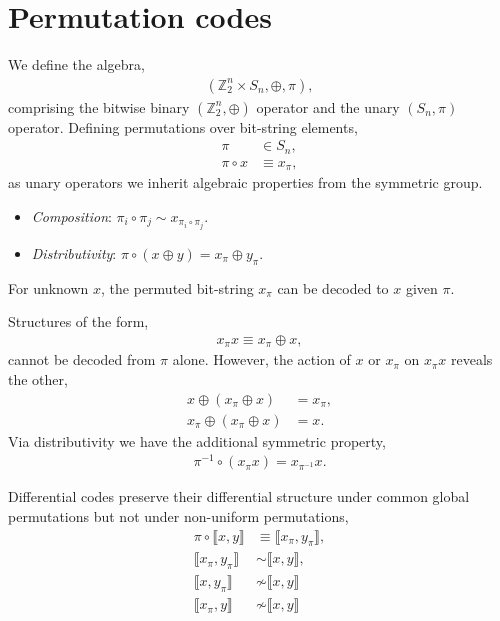 \documentclass[twocolumn, aps, amsmath, amssymb, nofootinbib, superscriptaddress, longbibliography, doublefloatfix, table-of-contents, eqsecnum, rmp]{revtex4-2}
\def\diff#1#2{\llbracket #1,#2\rrbracket}
\begin{document}

\section{Permutation codes}

We define the algebra,
\begin{align}
	(\mathbb{Z}_2^n \times S_n, \oplus,\pi),
\end{align}
comprising the bitwise binary $(\mathbb{Z}_2^n,\oplus)$ operator and the unary $(S_n,\pi)$ operator. Defining permutations over bit-string elements,
\begin{align}
	\pi &\in S_n,\nonumber\\
	\pi\circ x &\equiv x_\pi,
\end{align}
as unary operators we inherit algebraic properties from the symmetric group.
\begin{itemize}
	\item \emph{Composition}: $\pi_i \circ \pi_j \sim x_{\pi_i\circ \pi_j}$.
	\item \emph{Distributivity}: $\pi\circ(x\oplus y) = x_\pi \oplus y_\pi$.
\end{itemize}
For unknown $x$, the permuted bit-string $x_\pi$ can be decoded to $x$ given $\pi$.

Structures of the form,
\begin{align}
	x_\pi x \equiv x_\pi \oplus x,
\end{align}
cannot be decoded from $\pi$ alone. However, the action of $x$ or $x_\pi$ on $x_\pi x$ reveals the other,
\begin{align}
	x \oplus (x_\pi \oplus x) & = x_\pi,\nonumber\\
	x_\pi \oplus (x_\pi \oplus x) &= x.
\end{align}
Via distributivity we have the additional symmetric property,
\begin{align}
	\pi^{-1} \circ (x_\pi x)	 = x_{\pi^{-1}} x.
\end{align}

Differential codes preserve their differential structure under common global permutations but not under non-uniform permutations,
\begin{align}
	\pi\circ \diff{x}{y}	 &\equiv \diff{x_\pi}{y_\pi},\nonumber\\
 	\diff{x_\pi}{y_\pi} &\sim \diff{x}{y},\nonumber\\
	\diff{x}{y_\pi} &\not\sim \diff{x}{y} \nonumber\\
	\diff{x_\pi}{y} &\not\sim \diff{x}{y}
\end{align}
\end{document}
